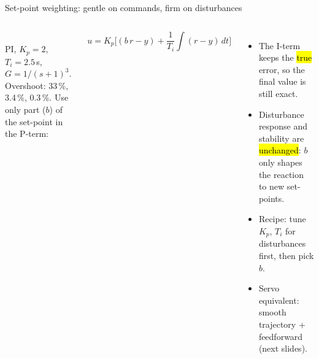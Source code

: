 \documentclass[aspectratio=169,10pt]{beamer}
\begin{document}
\begin{frame}{Set-point weighting: gentle on commands, firm on disturbances}
\begin{columns}[T]
\centering
{}\\
\footnotesize PI, $K_p=2$, $T_i=2.5$\,s, $G=1/(s+1)^3$. Overshoot: 33\,\%, 3.4\,\%, 0.3\,\%.
\small
Use only part ($b$) of the set-point in the P-term:
\begin{eqbox}
\[
u=K_p\Big[(b\,r-y)+\frac1{T_i}\!\int(r-y)\,dt\Big]
\]
\end{eqbox}
\footnotesize
\begin{itemize}
  \item The I-term keeps the \hl{true} error, so the final value is still exact.
  \item Disturbance response and stability are \hl{unchanged}: $b$ only shapes the reaction to new set-points.
  \item Recipe: tune $K_p$, $T_i$ for disturbances first, then pick $b$.
  \item Servo equivalent: smooth trajectory + feedforward (next slides).
\end{itemize}
\end{columns}
\end{frame}
\end{document}
